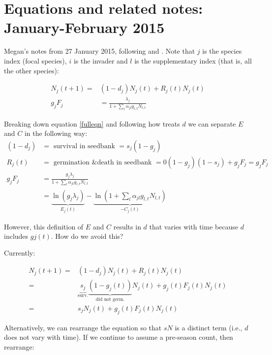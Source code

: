 \documentclass[11pt,a4paper,oneside]{article}
\begin{document}
\newpage
\section{Equations and related notes: January-February 2015}

\noindent Megan's notes from 27 January 2015, following \citet{chesson2003} and \citet{godoy2014}. Note that $j$ is the species index (focal species), $i$ is the invader and $l$ is the supplementary index (that is, all the other species):

\begin{align}
\label{fulleqn} 
N_{j}(t+1) = & (1-d_{j})N_{j}(t) + R_{j}(t)N_{j}(t)  
\\
\label{eqngF} 
g_{j}F_{j} & = \frac{\lambda_{j}}{1+\sum\limits_{l}\alpha_{jl}g_{l,t}N_{l,t}} 
\end{align}

\noindent Breaking down equation \ref{fulleqn} and following how \cite{godoy2014} treats $d$ we can separate $E$ and $C$ in the following way:
\begin{align}
(1-d_{j}) & = \text{ survival in seedbank } = s_{j}(1-g_{j})
\\
R_{j}(t) & = \text{ germination \& death in seedbank } = 0(1-g_{j})(1-s_{j})+g_{j}F_{j} = g_{j}F_{j}
\\
g_{j}F_{j} & = \frac{g_{j}\lambda_{j}}{1+\sum\limits_{l}\alpha_{jl}g_{l,t}N_{l,t}}
\\
& = \underbrace{\ln(g_{j}\lambda_{j})}_\text{$E_{j}(t)$} -\underbrace{\ln(1+\sum\limits_{l}\alpha_{jl}g_{l,t}N_{l,t})}_\text{$-C_{j}(t)$}
\end{align}

\noindent However, this definition of $E$ and $C$ results in $d$ that varies with time because $d$ includes $g{j}(t)$.  How do we avoid this?

\noindent  Currently:

\begin{align}
N_{j}(t+1) = & (1-d_{j})N_{j}(t) + R_{j}(t)N_{j}(t) \\
= & \underbrace{s_{j}}_\text{surv.}\underbrace{(1-g_{j}(t))}_\text{did not germ.}N_{j}(t)+g_{j}(t)F_{j}(t)N_{j}(t)\\
= & s_{j}N_{j}(t) +g_{j}(t)F_{j}(t)N_{j}(t)
\end{align} 

\noindent Alternatively, we can rearrange the equation so that $sN$ is a distinct term (i.e., $d$ does not vary with time).  If we continue to assume a pre-season count, then rearrange:
\end{document}
